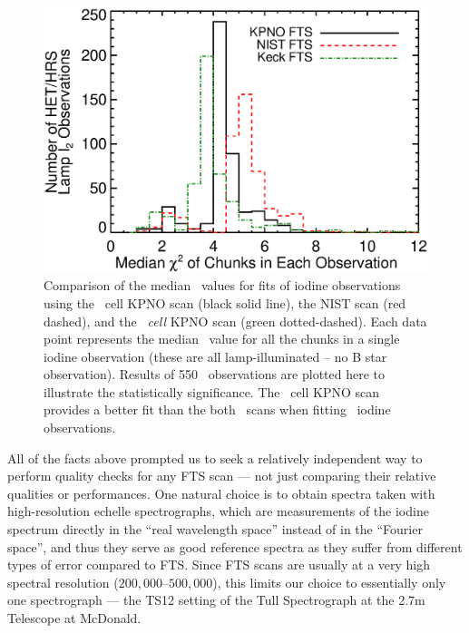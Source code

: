 \begin{figure}[!th]
\centering
\includegraphics[angle=0.,scale=0.38]{het/het_lamp_i2_fits_kpno_nist_keck.eps}
\caption{Comparison of the median \chisq\ values for fits of iodine
  observations using the \het\ cell KPNO scan (black solid line), the
  NIST scan (red dashed), and the {\em \keck\ cell} KPNO scan (green
  dotted-dashed). Each data point represents the median \chisq\ value
  for all the chunks in a single iodine observation (these are all
  lamp-illuminated -- no B star observation). Results of 550
  \het\ observations are plotted here to illustrate the statistically
  significance. The \keck\ cell KPNO scan provides a better fit than the
  both \het\ scans when fitting \het\ iodine observations.
  \label{fig:lampi2fit}}
\end{figure}

All of the facts above prompted us to seek a relatively
independent way to perform quality checks for any FTS scan --- not
just comparing their relative qualities or performances. One
natural choice is to obtain spectra taken with high-resolution echelle
spectrographs, which are measurements of the iodine spectrum directly
in the ``real wavelength space'' instead of in the ``Fourier space'', and
thus they serve as good reference spectra as they suffer from
different types of error compared to FTS. Since FTS scans are usually
at a very high spectral resolution ($200,000$--$500,000$), this limits
our choice to essentially only one spectrograph --- the TS12 setting
of the Tull Spectrograph at the 2.7m Telescope at McDonald.

